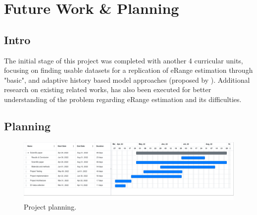 \chapter{Future Work \& Planning}
\label{cha:planning}

\section{Intro}
\label{sec:planningIntro}

The initial stage of this project was
completed with another 4 curricular units,
focusing on finding usable datasets for 
a replication of \gls{eRange} estimation
through "basic", and adaptive history based model approaches
(proposed by \cite{classicEVX}).
Additional research on existing related works,
has also been executed for better understanding
of the problem regarding \gls{eRange} estimation
and its difficulties.


\section{Planning}
\label{sec:planningPlanning}

\begin{figure}[H]
    \begin{center}
        \includegraphics[scale=0.27]{../figures/planning}
        \caption{Project planning.}
    \end{center}
\end{figure}


